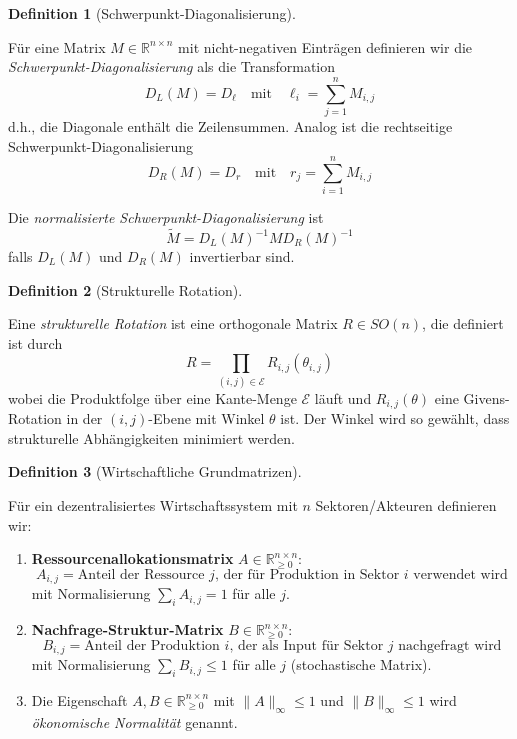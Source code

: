 \documentclass[a4paper,12pt]{article}
\theoremstyle{definition}
\newtheorem{definition}{Definition}
\begin{document}
\begin{definition}[Schwerpunkt-Diagonalisierung]
\label{def:schwerpunkt}

Für eine Matrix $M \in \mathbb{R}^{n \times n}$ mit nicht-negativen Einträgen definieren wir die \emph{Schwerpunkt-Diagonalisierung} als die Transformation
\[
D_L(M) = D_{\ell} \quad \text{mit} \quad \ell_i = \sum_{j=1}^n M_{i,j}
\]
d.h., die Diagonale enthält die Zeilensummen. Analog ist die rechtseitige Schwerpunkt-Diagonalisierung
\[
D_R(M) = D_r \quad \text{mit} \quad r_j = \sum_{i=1}^n M_{i,j}
\]

Die \emph{normalisierte Schwerpunkt-Diagonalisierung} ist
\[
\tilde{M} = D_L(M)^{-1} M D_R(M)^{-1}
\]
falls $D_L(M)$ und $D_R(M)$ invertierbar sind.
\end{definition}

\begin{definition}[Strukturelle Rotation]
\label{def:rotation}

Eine \emph{strukturelle Rotation} ist eine orthogonale Matrix $R \in SO(n)$, die definiert ist durch
\[
R = \prod_{(i,j) \in \mathcal{E}} R_{i,j}(\theta_{i,j})
\]
wobei die Produktfolge über eine Kante-Menge $\mathcal{E}$ läuft und $R_{i,j}(\theta)$ eine Givens-Rotation in der $(i,j)$-Ebene mit Winkel $\theta$ ist. Der Winkel wird so gewählt, dass strukturelle Abhängigkeiten minimiert werden.
\end{definition}

\begin{definition}[Wirtschaftliche Grundmatrizen]
\label{def:grundmatrizen}

Für ein dezentralisiertes Wirtschaftssystem mit $n$ Sektoren/Akteuren definieren wir:

\begin{enumerate}
\item \textbf{Ressourcenallokationsmatrix} $A \in \mathbb{R}^{n \times n}_{\geq 0}$:
\[
A_{i,j} = \text{Anteil der Ressource } j \text{, der für Produktion in Sektor } i \text{ verwendet wird}
\]
mit Normalisierung $\sum_i A_{i,j} = 1$ für alle $j$.

\item \textbf{Nachfrage-Struktur-Matrix} $B \in \mathbb{R}^{n \times n}_{\geq 0}$:
\[
B_{i,j} = \text{Anteil der Produktion } i \text{, der als Input für Sektor } j \text{ nachgefragt wird}
\]
mit Normalisierung $\sum_i B_{i,j} \leq 1$ für alle $j$ (stochastische Matrix).

\item Die Eigenschaft $A, B \in \mathbb{R}^{n \times n}_{\geq 0}$ mit $\|A\|_\infty \leq 1$ und $\|B\|_\infty \leq 1$ wird \emph{ökonomische Normalität} genannt.
\end{enumerate}
\end{definition}
\end{document}
